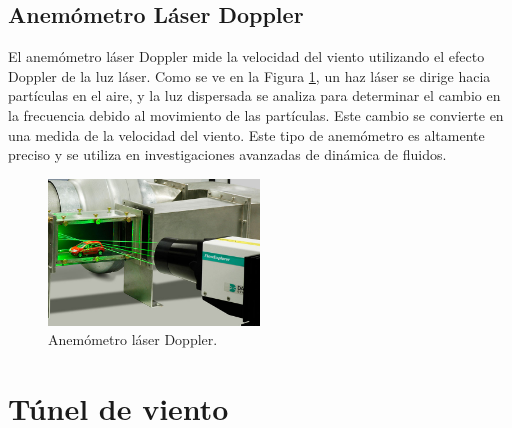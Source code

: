 \subsection*{Anemómetro Láser Doppler}

El anemómetro láser Doppler mide la velocidad del viento utilizando el efecto Doppler de la luz láser. Como se ve en la Figura \ref{fig:laserDoppler}, un haz láser se dirige hacia partículas en el aire, y la luz dispersada se analiza para determinar el cambio en la frecuencia debido al movimiento de las partículas. Este cambio se convierte en una medida de la velocidad del viento. Este tipo de anemómetro es altamente preciso y se utiliza en investigaciones avanzadas de dinámica de fluidos.

\begin{figure}[h]
    \centering
    \includegraphics[width=0.5\textwidth]{Figuras/viento/sensores/laserDoppler.png}
    \caption{Anemómetro láser Doppler. \cite{dantecLDA2024}}
    \label{fig:laserDoppler}
\end{figure}




\section{Túnel de viento}\label{tunelDeViento}

